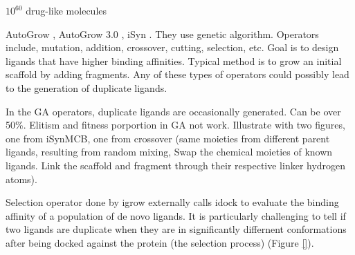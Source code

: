\documentclass[twocolumn]{svjour3}          %
\begin{document}
$10^{60}$ drug-like molecules \cite{1104} %

AutoGrow \cite{466}, AutoGrow 3.0 \cite{1354}, iSyn \cite{1381}. They use genetic algorithm. Operators include, mutation, addition, crossover, cutting, selection, etc. Goal is to design ligands that have higher binding affinities. Typical method is to grow an initial scaffold by adding fragments. Any of these types of operators could possibly lead to the generation of duplicate ligands.

In the GA operators, duplicate ligands are occasionally generated. Can be over 50\%. Elitism and fitness porportion in GA not work. Illustrate with two figures, one from iSynMCB, one from crossover (same moieties from different parent ligands, resulting from random mixing, Swap the chemical moieties of known ligands. Link the scaffold and fragment through their respective linker hydrogen atoms).

Selection operator done by igrow externally calls idock to evaluate the binding affinity of a population of de novo ligands. It is particularly challenging to tell if two ligands are duplicate when they are in significantly differnent conformations after being docked against the protein (the selection process) (Figure \ref{}).
\end{document}
